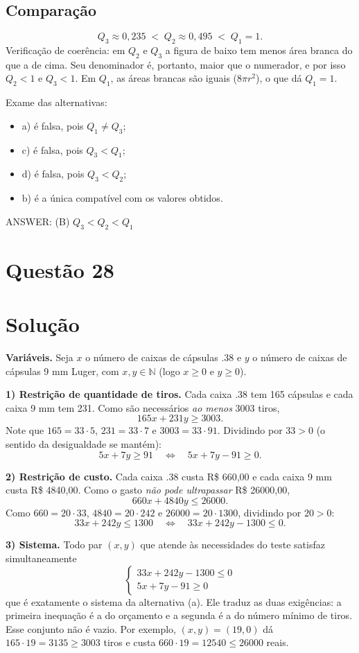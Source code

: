 \documentclass{article}%
\begin{document}
\subsection*{Comparação}
\[
Q_3\approx 0{,}235\;<\;Q_2\approx 0{,}495\;<\;Q_1=1 .
\]
Verificação de coerência: em $Q_2$ e $Q_3$ a figura de baixo tem menos área branca do que a de cima. Seu denominador é, portanto, maior que o numerador, e por isso $Q_2<1$ e $Q_3<1$. Em $Q_1$, as áreas brancas são iguais ($8\pi r^2$), o que dá $Q_1=1$.

Exame das alternativas:
\begin{itemize}
\item a) é falsa, pois $Q_1\neq Q_3$;
\item c) é falsa, pois $Q_3<Q_1$;
\item d) é falsa, pois $Q_3<Q_2$;
\item b) é a única compatível com os valores obtidos.
\end{itemize}

ANSWER: (B) $Q_3<Q_2<Q_1$%
\newpage%
\section*{Questão 28}

\section*{Solução}

\textbf{Variáveis.} Seja $x$ o número de caixas de cápsulas .38 e $y$ o número de caixas de cápsulas 9 mm Luger, com $x, y \in \mathbb{N}$ (logo $x \ge 0$ e $y \ge 0$).

\textbf{1) Restrição de quantidade de tiros.} Cada caixa .38 tem 165 cápsulas e cada caixa 9 mm tem 231. Como são necessários \emph{ao menos} 3003 tiros,
\[
165x + 231y \ge 3003 .
\]
Note que $165 = 33 \cdot 5$, $231 = 33 \cdot 7$ e $3003 = 33 \cdot 91$. Dividindo por $33 > 0$ (o sentido da desigualdade se mantém):
\[
5x + 7y \ge 91 \quad\Longleftrightarrow\quad 5x + 7y - 91 \ge 0 .
\]

\textbf{2) Restrição de custo.} Cada caixa .38 custa R\$ 660,00 e cada caixa 9 mm custa R\$ 4840,00. Como o gasto \emph{não pode ultrapassar} R\$ 26000,00,
\[
660x + 4840y \le 26000 .
\]
Como $660 = 20 \cdot 33$, $4840 = 20 \cdot 242$ e $26000 = 20 \cdot 1300$, dividindo por $20 > 0$:
\[
33x + 242y \le 1300 \quad\Longleftrightarrow\quad 33x + 242y - 1300 \le 0 .
\]

\textbf{3) Sistema.} Todo par $(x, y)$ que atende às necessidades do teste satisfaz simultaneamente
\[
\begin{cases}
33x + 242y - 1300 \le 0 \\
5x + 7y - 91 \ge 0
\end{cases}
\]
que é exatamente o sistema da alternativa (a). Ele traduz as duas exigências: a primeira inequação é a do orçamento e a segunda é a do número mínimo de tiros. Esse conjunto não é vazio. Por exemplo, $(x, y) = (19, 0)$ dá $165 \cdot 19 = 3135 \ge 3003$ tiros e custa $660 \cdot 19 = 12540 \le 26000$ reais.
\end{document}
